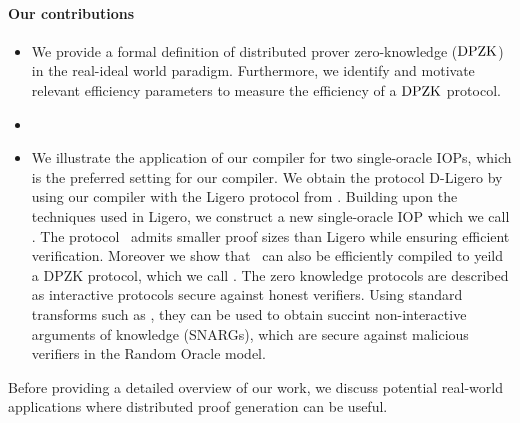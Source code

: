 \paragraph*{Our contributions}
\begin{itemize}
	\item We provide a formal definition of distributed prover zero-knowledge ($\text{DPZK}$) in the real-ideal world paradigm. Furthermore, we identify and motivate relevant efficiency parameters to measure the efficiency of a $\text{DPZK}$ protocol. %
	\item {}
	\item We illustrate the application of our compiler for two single-oracle IOPs, which is the preferred setting for our compiler.
	We obtain the protocol \textsf{D-Ligero} by using our compiler with the Ligero protocol from \cite{ligero}. Building upon the techniques
	used in Ligero, we construct a new single-oracle IOP which we call \name. The protocol \name\ admits smaller proof sizes
	than Ligero while ensuring efficient verification. Moreover we show that \name\ can also be efficiently compiled to yeild a DPZK protocol, 
	which we call \dpname. The zero knowledge protocols are described as interactive protocols secure against honest verifiers. Using standard
	transforms such as \cite{FS86, BCS16}, they can be used to obtain succint non-interactive arguments of knowledge (SNARGs), 
	which are secure against malicious verifiers in the Random Oracle model.
\end{itemize}
Before providing a detailed overview of our work, we discuss potential real-world applications where distributed proof generation can be useful. 



